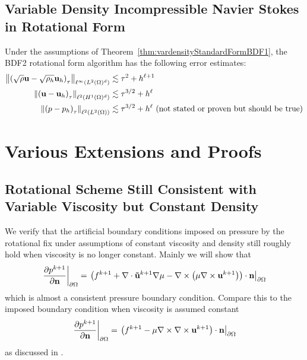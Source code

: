 \documentclass[letterpaper]{erdc}
\begin{document}
\section{Variable Density Incompressible Navier Stokes in Rotational Form}

\begin{conjecture}
  Under the assumptions of Theorem~\ref{thm:vardensityStandardFormBDF1}, the BDF2 rotational form algorithm has the following error estimates:
  \begin{align}
    \left\| \left(\sqrt{\rho} \textbf{u} - \sqrt{\rho_h} \textbf{u}_h \right)_{\tau} \right\|_{\ell^{\infty}(L^2(\Omega)^d)} &\lesssim \tau^2 + h^{\ell+1}\\
    \left\| \left( \textbf{u} - \textbf{u}_h \right)_{\tau} \right\|_{\ell^2(H^1(\Omega)^d)} &\lesssim \tau^{3/2} + h^{\ell}\\
    \left\|\left(p - p_h\right)_{\tau} \right\|_{\ell^{2}(L^2(\Omega))} &\lesssim \tau^{3/2} + h^{\ell}  \mbox{  (not stated or proven but should be true)}
  \end{align}
\end{conjecture}






\appendix
%
%
%
%
\chapter{Various Extensions and Proofs}

%
%
%
\section{Rotational Scheme Still Consistent with Variable Viscosity but Constant Density}
We verify that the artificial boundary conditions imposed on pressure by the rotational fix under assumptions of constant viscosity and density still roughly hold when viscosity is no longer constant.  Mainly we will show that 
\begin{equation}
  \left.\frac{\partial p^{k+1}}{\partial \textbf{n}}\right|_{\partial\Omega} = \left.\left(f^{k+1} + \nabla\cdot\mathbf{\tilde{u}}^{k+1}\nabla\mu - \nabla\times\left(\mu\nabla\times \textbf{u}^{k+1}  \right)  \right)\cdot \textbf{n}\right|_{\partial\Omega}
\end{equation}
which is almost a consistent pressure boundary condition.  Compare this to the imposed boundary condition when viscosity is assumed constant
\begin{equation}
  \left.\frac{\partial p^{k+1}}{\partial \textbf{n}}\right|_{\partial\Omega} = \left.\left(f^{k+1} - \mu\nabla\times\nabla\times \textbf{u}^{k+1} \right)\cdot \textbf{n}\right|_{\partial\Omega}
\end{equation}
 as discussed in \cite{guermond2004error}.  
 
\end{document}
